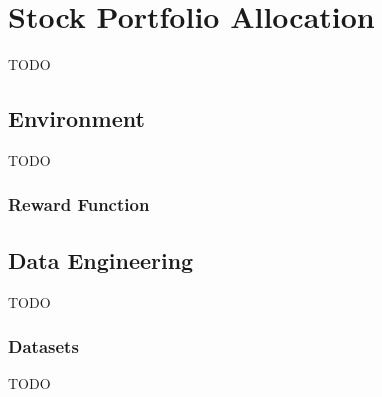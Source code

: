 \documentclass[../chapters]{subfiles}
\begin{document}
    \chapter{Stock Portfolio Allocation}\label{sec:implementation}
    TODO


    \section{Environment}\label{sec:environment}
    TODO

    \subsection{Reward Function}\label{subsec:reward-function}


    \section{Data Engineering}\label{ch:data-engineering}
    TODO

    \subsection{Datasets}\label{sec:datasets}
    TODO


\end{document}
